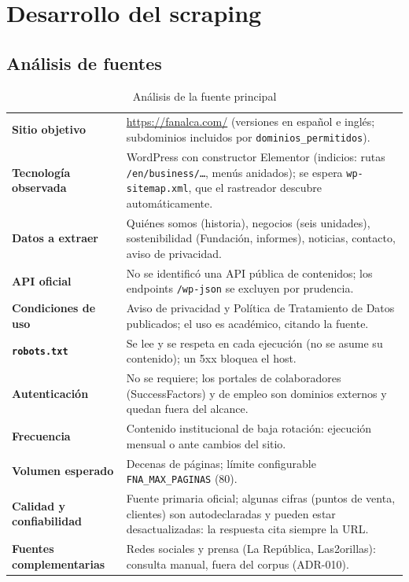 \chapter{Desarrollo del scraping}\label{cap:scraping}

\section{Análisis de fuentes}
\begin{table}[H]\centering\small
\caption{Análisis de la fuente principal}\label{tab:fuente}
\begin{tabularx}{\linewidth}{@{}>{\bfseries}l X@{}}\toprule
Sitio objetivo & \url{https://fanalca.com/} (versiones en español e inglés; subdominios incluidos por
\texttt{dominios\_permitidos}).\\
Tecnología observada & WordPress con constructor Elementor (indicios: rutas \texttt{/en/business/\ldots},
menús anidados); se espera \texttt{wp-sitemap.xml}, que el rastreador descubre automáticamente.\\
Datos a extraer & Quiénes somos (historia), negocios (seis unidades), sostenibilidad (Fundación, informes),
noticias, contacto, aviso de privacidad.\\
API oficial & No se identificó una API pública de contenidos; los endpoints \texttt{/wp-json} se excluyen por
prudencia.\\
Condiciones de uso & Aviso de privacidad y Política de Tratamiento de Datos publicados; el uso es académico,
citando la fuente.\\
\texttt{robots.txt} & Se lee y se respeta en cada ejecución (no se asume su contenido); un 5xx bloquea el host.\\
Autenticación & No se requiere; los portales de colaboradores (SuccessFactors) y de empleo son dominios
externos y quedan fuera del alcance.\\
Frecuencia & Contenido institucional de baja rotación: ejecución mensual o ante cambios del sitio.\\
Volumen esperado & Decenas de páginas; límite configurable \texttt{FNA\_MAX\_PAGINAS} (80).\\
Calidad y confiabilidad & Fuente primaria oficial; algunas cifras (puntos de venta, clientes) son
autodeclaradas y pueden estar desactualizadas: la respuesta cita siempre la URL.\\
Fuentes complementarias & Redes sociales y prensa (La República, Las2orillas): consulta manual, fuera del
corpus (ADR-010).\\\bottomrule
\end{tabularx}
\end{table}

